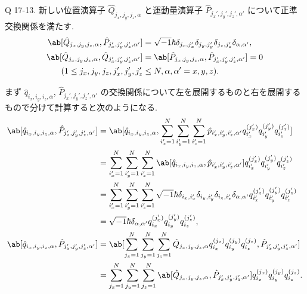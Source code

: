 \documentclass[uplatex,dvipdfmx,a4paper,11pt]{jlreq}
\numberwithin{equation}{section}
\theoremstyle{definition}
\begin{document}
\begin{itembox}[l]{Q 17-13.}
  新しい位置演算子 $\hat{Q}_{j_x,j_y,j_z,\alpha}$ と運動量演算子 $\hat{P}_{j_x',j_y',j_z',\alpha'}$ について正準交換関係を満たす.
  \begin{align}
    \ab[\hat{Q}_{j_x,j_y,j_z,\alpha}, \hat{P}_{j_x',j_y',j_z',\alpha'}] & = \sqrt{-1}\hbar\delta_{j_x,j_x'}\delta_{j_y,j_y'}\delta_{j_z,j_z'}\delta_{\alpha,\alpha'}, \\
    \ab[\hat{Q}_{j_x,j_y,j_z,\alpha}, \hat{Q}_{j_x',j_y',j_z',\alpha'}] & = \ab[\hat{P}_{j_x,j_y,j_z,\alpha}, \hat{P}_{j_x',j_y',j_z',\alpha'}] = 0                   \\
    (1\leq j_x,j_y,j_z,j_x',j_y',j_z'                                   & \leq N, \alpha,\alpha' = x,y,z).
  \end{align}
\end{itembox}
まず $\hat{q}_{i_x,i_y,i_z,\alpha}$, $\hat{P}_{j_x',j_y',j_z',\alpha'}$ の交換関係について左を展開するものと右を展開するもので分けて計算すると次のようになる.
\begin{align}
  \ab[\hat{q}_{i_x,i_y,i_z,\alpha}, \hat{P}_{j_x',j_y',j_z',\alpha'}] & = \ab[\hat{q}_{i_x,i_y,i_z,\alpha}, \sum_{i_x'=1}^{N}\sum_{i_y'=1}^{N}\sum_{i_z'=1}^{N}\hat{p}_{i_x',i_y',i_z',\alpha'}q_{i_x'}^{(j_x')}q_{i_y'}^{(j_y')}q_{i_z'}^{(j_z')}]                      \\
                                                                      & = \sum_{i_x'=1}^{N}\sum_{i_y'=1}^{N}\sum_{i_z'=1}^{N}\ab[\hat{q}_{i_x,i_y,i_z,\alpha}, \hat{p}_{i_x',i_y',i_z',\alpha'}]q_{i_x'}^{(j_x')}q_{i_y'}^{(j_y')}q_{i_z'}^{(j_z')}                      \\
                                                                      & = \sum_{i_x'=1}^{N}\sum_{i_y'=1}^{N}\sum_{i_z'=1}^{N}\sqrt{-1}\hbar\delta_{i_x,i_x'}\delta_{i_y,i_y'}\delta_{i_z,i_z'}\delta_{\alpha,\alpha'}q_{i_x'}^{(j_x')}q_{i_y'}^{(j_y')}q_{i_z'}^{(j_z')} \\
                                                                      & = \sqrt{-1}\hbar\delta_{\alpha,\alpha'}q_{i_x}^{(j_x')}q_{i_y}^{(j_y')}q_{i_z}^{(j_z')},                                                                                                         \\
  \ab[\hat{q}_{i_x,i_y,i_z,\alpha}, \hat{P}_{j_x',j_y',j_z',\alpha'}] & = \ab[\sum_{j_x=1}^{N}\sum_{j_y=1}^{N}\sum_{j_z=1}^{N}\hat{Q}_{j_x,j_y,j_z,\alpha}q_{i_x}^{(j_x)}q_{i_y}^{(j_y)}q_{i_z}^{(j_z)}, \hat{P}_{j_x',j_y',j_z',\alpha'}]                               \\
                                                                      & = \sum_{j_x=1}^{N}\sum_{j_y=1}^{N}\sum_{j_z=1}^{N}\ab[\hat{Q}_{j_x,j_y,j_z,\alpha}, \hat{P}_{j_x',j_y',j_z',\alpha'}]q_{i_x}^{(j_x)}q_{i_y}^{(j_y)}q_{i_z}^{(j_z)}.
\end{align}
\end{document}
